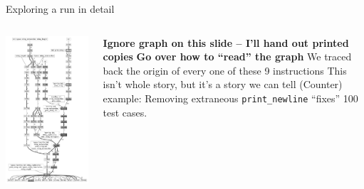 \documentclass{beamer}
\newcommand{\linespace}{\vskip 0.25cm}
\begin{document}
\begin{frame}{Exploring a run in detail}
	
	\begin{columns}
		\begin{column}{0.4 \linewidth}
			\centering
			\includegraphics[height = 0.8 \textheight]{../../figures/filtered_fill.pdf}
		\end{column}
		
		\begin{column}{0.6 \linewidth}
			\begin{overprint}
				\textbf{Ignore graph on this slide -- I'll hand out printed copies}
				\linespace
				\textbf{Go over how to ``read'' the graph}
				\onslide<2>
				We traced back the origin of every one of these 9 instructions
				\linespace
				This isn't whole story, but it's a story we can tell
				\linespace
				(Counter) example: Removing extraneous \texttt{print\_newline} ``fixes'' 100 test cases.
			\end{overprint}
		\end{column}
	\end{columns}
\end{frame}
\end{document}
